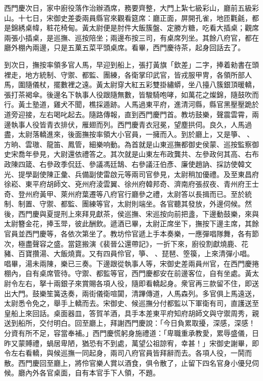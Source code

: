 西門慶次日，家中廚役落作治辦酒席，務要齊整，大門上紮七級彩山，廳前五級彩山。十七日，宋御史差委兩員縣官來觀看筵席：廳正面，屏開孔雀，地匝氍毹，都是錦綉桌幃，粧花椅甸。黃太尉便是肘件大飯簇盤、定勝方糖，吃看大插桌；觀席兩張小插桌，是巡撫、巡按陪坐；兩邊布按三司，有桌席列坐。其餘八府官，都在廳外棚內兩邊，只是五菓五菜平頭桌席。看畢，西門慶待茶，起身回話去了。

到次日，撫按率領多官人馬，早迎到船上，張打黃旗「欽差」二字，捧着勑書在頭裡走，地方統制、守禦、都監、團練，各衛掌印武官，皆戎服甲冑，各領所部人馬，圍隨儀杖，擺數裡之遠。黃太尉穿大紅五彩雙掛繡蟒，坐八擡八簇銀頂暖轎，張打茶褐傘。後邊名下執事人役跟隨無數，皆駿騎咆哮，如萬花之燦錦，隨鼓吹而行。黃土塾道，雞犬不聞，樵採遁跡。人馬過東平府，進清河縣，縣官黑壓壓跪於道旁迎接，左右喝叱起去。隨路傳報，直到西門慶門首。教坊鼓樂，聲震雲霄，兩邊執事人役皆青衣排伏，雁翅而列。西門慶青衣冠冕，望塵拱伺。{}良久，人馬過盡，太尉落轎進來，後面撫按率領大小官員，一擁而入。到於廳上，又是箏、𥱧、方晌、雲璈、龍笛、鳳管，細樂响動。為首就是山東巡撫都御史侯蒙、巡按監察御史宋喬年參見，大尉還依禮答之。其次就是山東左布政龔共、左參政何其高、右布政陳四箴、右參政季侃廷、參議馮廷鵠、右參議汪伯彥、廉使趙訥、採訪使韓文光、提學副使陳正彙、兵備副使雷啟元等兩司官參見，太尉稍加優禮。及至東昌府徐崧、東平府胡師文、兗州府淩雲翼、徐州府韓邦奇、濟南府張叔夜、青州府王士奇、登州府黃甲、萊州府葉遷等八府官行廳參之禮，太尉答以長揖而已。至於統制、制置、守禦、都監、團練等官，太尉則端坐。各官聽其發放，外邊伺候。然後，西門慶與夏提刑上來拜見獻茶，{}侯巡撫、宋巡按向前把盞，下邊動鼓樂，來與太尉簪金花，捧玉斝，彼此酬飲。遞酒已畢，太尉正席坐下，撫按下邊主席，其餘官員並西門慶等，各依次第坐了。教坊伶官遞上手本奏樂，一應彈唱隊舞，各有節次，極盡聲容之盛。當筵搬演《裴晉公還帶記》，一折下來，廚役割獻燒鹿、花豬、百寶攢湯、大飯燒賣。又有四員伶官，箏、𥱧、琵琶、箜篌，上來清彈小唱。唱畢，湯未兩陳，樂已三奏。下邊跟從執事人等，宋御史差兩員州官，在西門慶捲棚內，自有桌席管待。守禦、都監等官，西門慶都安在前邊客位，自有坐處。黃太尉令左右，拏十兩銀子來賞賜各項人役，隨即看轎起身。衆官再三款留不住，即送出大門。鼓樂笙簧迭奏，兩街儀衛喧闐，清蹕傳道，人馬森列。多官俱上馬遠送，太尉悉令免之，舉手上轎而去。{}宋御史、候巡撫分付都監以下軍衛有司，直護送至皇船上來回話。桌面器皿，答賀羊酒，具手本差東平府知府胡師文與守禦周秀，親送到船所，交付明白。回至廳上，拜謝西門慶說：「今日負累取擾，深感，深感！分資有所不足，容當奉補。」西門慶慌躬身施禮道：「卑職重承教愛，累辱盛儀，日昨又蒙賻禮，蝸居卑陋，猶恐有不到處，萬望公祖諒宥，幸甚！」宋御史謝畢，即令左右看轎，與候巡撫一同起身，兩司八府官員皆拜辭而去。各項人役，一鬨而散。西門慶回至廳上，將伶官樂人賞以酒食，俱令散了，止留下四名官身小優兒伺候。廳內外各官桌面，自有本官手下人領，{}不題。


